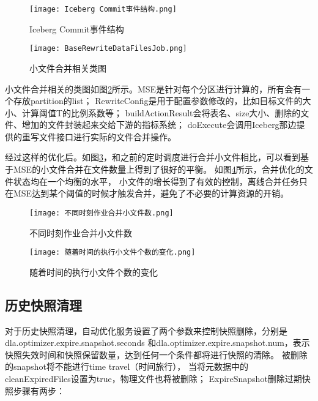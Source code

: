 \begin{figure}[H]
  \centering
  \texttt{[image: Iceberg Commit事件结构.png]}
  \caption{Iceberg Commit事件结构}
  \label{fig:Commit事件结构}
\end{figure}

\begin{figure}[H]
  \centering
  \texttt{[image: BaseRewriteDataFilesJob.png]}
  \caption{小文件合并相关类图}
  \label{fig:BaseRewriteDataFilesJob}
\end{figure}

小文件合并相关的类图如图\ref{fig:BaseRewriteDataFilesJob}所示。MSE是针对每个分区进行计算的，所有会有一个存放partition的list；
RewriteConfig是用于配置参数修改的，比如目标文件的大小、计算阈值T的比例系数等；
buildActionResult会将表名、size大小、删除的文件、增加的文件封装起来交给下游的指标系统；
doExecute会调用Iceberg那边提供的重写文件接口进行实际的文件合并操作。

经过这样的优化后。如图\ref{fig:不同时刻作业合并小文件数}，和之前的定时调度进行合并小文件相比，可以看到基于MSE的小文件合并在文件数量上得到了很好的平衡。
如图\ref{fig:随着时间的执行小文件个数的变化}所示，合并优化的文件状态均在一个均衡的水平，
小文件的增长得到了有效的控制，离线合并任务只在MSE达到某个阈值的时候才触发合并，避免了不必要的计算资源的开销。

\begin{figure}[H]
  \centering
  \texttt{[image: 不同时刻作业合并小文件数.png]}
  \caption{不同时刻作业合并小文件数}
  \label{fig:不同时刻作业合并小文件数}
\end{figure}

\begin{figure}[H]
  \centering
  \texttt{[image: 随着时间的执行小文件个数的变化.png]}
  \caption{随着时间的执行小文件个数的变化}
  \label{fig:随着时间的执行小文件个数的变化}
\end{figure}

\subsection{历史快照清理}

对于历史快照清理，自动优化服务设置了两个参数来控制快照删除，分别是dla.optimizer.expire.snapshot.seconds
和dla.optimizer.expire.snapshot.num，表示快照失效时间和快照保留数量，达到任何一个条件都将进行快照的清除。
被删除的snapshot将不能进⾏time travel（时间旅⾏），
当将元数据中的cleanExpiredFiles设置为true，物理⽂件也将被删除；
ExpireSnapshot删除过期快照步骤有两步：

